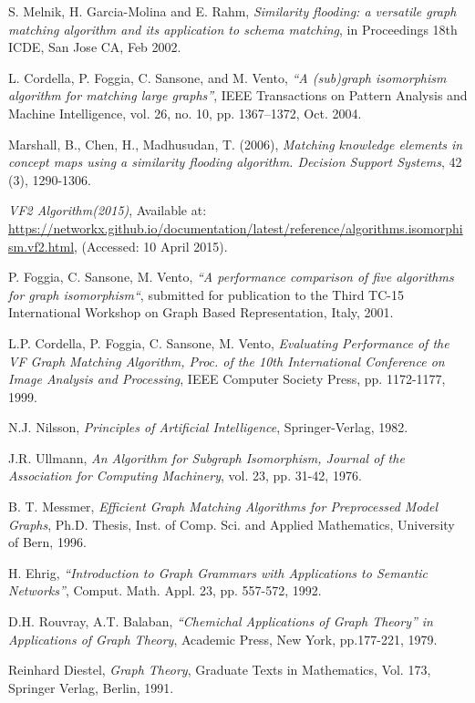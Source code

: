 
 \begin{thebibliography}{9}

	S. Melnik, H. Garcia-Molina and E. Rahm, 
	\emph{Similarity flooding: a versatile graph matching algorithm and its application to schema matching},
	in Proceedings 18th ICDE, San Jose
	CA, Feb 2002.
	
	L. Cordella, P. Foggia, C. Sansone, and M. Vento, 
	\emph{“A (sub)graph isomorphism algorithm for matching large graphs”},
	IEEE Transactions on Pattern Analysis and Machine Intelligence,
	vol. 26, no. 10, pp. 1367–1372, Oct. 2004.
	
	Marshall, B., Chen, H., Madhusudan, T. (2006),
	\emph{Matching knowledge elements in concept maps using a similarity flooding algorithm. Decision Support Systems},
	42 (3), 1290-1306.	
	
	\emph{VF2 Algorithm(2015)},
	Available at: \url{https://networkx.github.io/documentation/latest/reference/algorithms.isomorphism.vf2.html},
	(Accessed: 10 April 2015).
	
	P. Foggia, C. Sansone, M. Vento,
	\emph{“A performance comparison of five algorithms for graph isomorphism“},
	submitted for publication to the Third TC-15 International Workshop on Graph Based Representation, Italy, 2001.
	
	L.P. Cordella, P. Foggia, C. Sansone, M. Vento, 
	\emph{Evaluating Performance of the VF Graph Matching Algorithm, Proc. of the 10th International Conference on Image	Analysis and Processing},
	IEEE Computer Society Press, pp. 1172-1177, 1999.

	N.J. Nilsson, 
	\emph{Principles of Artificial Intelligence},
	Springer-Verlag, 1982.	
	
	J.R. Ullmann, 
	\emph{An Algorithm for Subgraph Isomorphism, Journal of the Association for Computing Machinery},
	vol. 23, pp. 31-42, 1976.
	
	B. T. Messmer, 
	\emph{Efficient Graph Matching Algorithms for Preprocessed Model	Graphs},
	Ph.D. Thesis, Inst. of Comp. Sci. and Applied Mathematics,
	University of Bern, 1996.
	
	H. Ehrig, 
	\emph{“Introduction to Graph Grammars with Applications to Semantic Networks”},
	Comput. Math. Appl. 23, pp. 557-572, 1992.
	
	D.H. Rouvray, A.T. Balaban,
	\emph{“Chemichal Applications of Graph Theory” in Applications of Graph Theory},
	Academic Press, New York, pp.177-221, 1979.
	
	Reinhard Diestel, 
	\emph{Graph Theory},
	Graduate Texts in Mathematics,
	Vol. 173, Springer Verlag, Berlin, 1991.

\end{thebibliography}